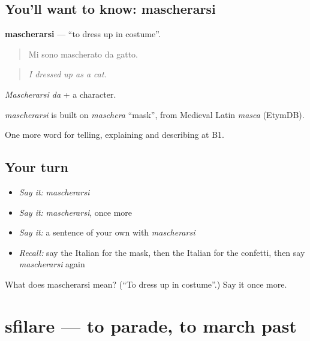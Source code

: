 \subsection*{You'll want to know: mascherarsi}
\textbf{mascherarsi} — \textquotedblleft{}to dress up in costume\textquotedblright{}.

\begin{quote}
Mi sono mascherato da gatto.
\end{quote}

\begin{quote}
\emph{I dressed up as a cat.}
\end{quote}

\emph{Mascherarsi da} + a character.

\begin{cousinweb}
\emph{mascherarsi} is built on \emph{maschera} \textquotedblleft{}mask\textquotedblright{}, from Medieval Latin \emph{masca} (EtymDB).
\end{cousinweb}

\begin{grammarlens}[title={What you've built}]
One more word for telling, explaining and describing at B1.
\end{grammarlens}

\subsection*{Your turn}
\begin{itemize}
\raggedright
  \item \emph{Say it:} \emph{mascherarsi}
  \item \emph{Say it:} \emph{mascherarsi}, once more
  \item \emph{Say it:} a sentence of your own with \emph{mascherarsi}
  \item \emph{Recall:} say the Italian for the mask, then the Italian for the confetti, then say \emph{mascherarsi} again
\end{itemize}

\begin{tcolorbox}[breakable,colback=teal!4,colframe=teal!35!black,title={Before you move on}]
What does mascherarsi mean? (\textquotedblleft{}To dress up in costume\textquotedblright{}.) Say it once more.
\end{tcolorbox}
\section[sfilare]{sfilare — to parade, to march past}

